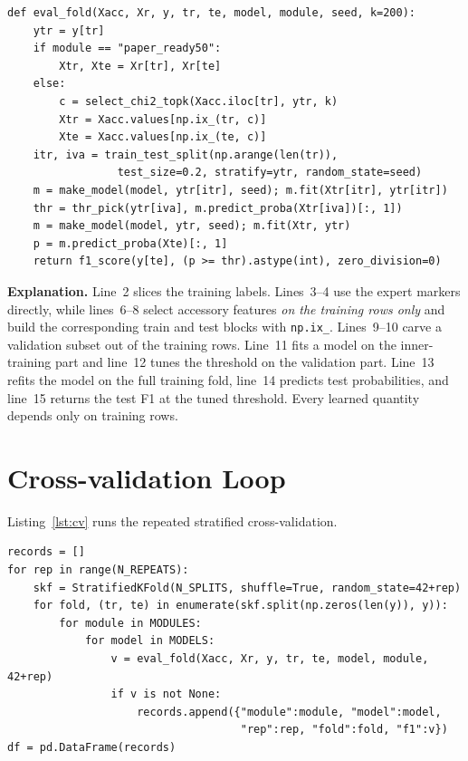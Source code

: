 \documentclass[../main.tex]{subfiles}
\begin{document}
\begin{lstlisting}[caption={Leakage-free evaluation of one fold.},label=lst:fold]
def eval_fold(Xacc, Xr, y, tr, te, model, module, seed, k=200):
    ytr = y[tr]
    if module == "paper_ready50":
        Xtr, Xte = Xr[tr], Xr[te]
    else:
        c = select_chi2_topk(Xacc.iloc[tr], ytr, k)
        Xtr = Xacc.values[np.ix_(tr, c)]
        Xte = Xacc.values[np.ix_(te, c)]
    itr, iva = train_test_split(np.arange(len(tr)),
                 test_size=0.2, stratify=ytr, random_state=seed)
    m = make_model(model, ytr[itr], seed); m.fit(Xtr[itr], ytr[itr])
    thr = thr_pick(ytr[iva], m.predict_proba(Xtr[iva])[:, 1])
    m = make_model(model, ytr, seed); m.fit(Xtr, ytr)
    p = m.predict_proba(Xte)[:, 1]
    return f1_score(y[te], (p >= thr).astype(int), zero_division=0)
\end{lstlisting}

\noindent\textbf{Explanation.} Line~2 slices the training labels. Lines~3--4 use the expert markers directly, while lines~6--8 select accessory features \emph{on the training rows only} and build the corresponding train and test blocks with \texttt{np.ix\_}. Lines~9--10 carve a validation subset out of the training rows. Line~11 fits a model on the inner-training part and line~12 tunes the threshold on the validation part. Line~13 refits the model on the full training fold, line~14 predicts test probabilities, and line~15 returns the test F1 at the tuned threshold. Every learned quantity depends only on training rows.

\section{Cross-validation Loop}

Listing~\ref{lst:cv} runs the repeated stratified cross-validation.

\begin{lstlisting}[caption={Repeated stratified cross-validation.},label=lst:cv]
records = []
for rep in range(N_REPEATS):
    skf = StratifiedKFold(N_SPLITS, shuffle=True, random_state=42+rep)
    for fold, (tr, te) in enumerate(skf.split(np.zeros(len(y)), y)):
        for module in MODULES:
            for model in MODELS:
                v = eval_fold(Xacc, Xr, y, tr, te, model, module, 42+rep)
                if v is not None:
                    records.append({"module":module, "model":model,
                                    "rep":rep, "fold":fold, "f1":v})
df = pd.DataFrame(records)
\end{lstlisting}
\end{document}
